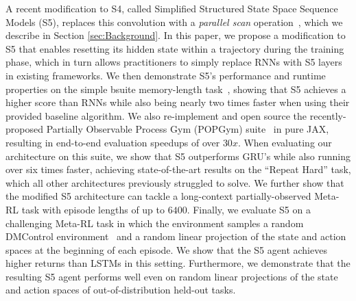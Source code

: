 \documentclass{article}
\begin{document}
A recent modification to S4, called Simplified Structured State Space Sequence Models (S5), replaces this convolution with a \textit{parallel scan} operation~\citep{smith2022simplified}, which we describe in Section \ref{sec:Background}. In this paper, we propose a modification to S5 that enables resetting its hidden state within a trajectory during the training phase, which in turn allows practitioners to simply replace RNNs with S5 layers in existing frameworks. We then demonstrate S5's performance and runtime properties on the simple bsuite memory-length task~\citep{osband2019behaviour}, showing that S5 achieves a higher score than RNNs while also being nearly two times faster when using their provided baseline algorithm. 
We also re-implement and open source the recently-proposed Partially Observable Process Gym (POPGym) suite~\citep{morad2023popgym} in pure JAX, resulting in end-to-end evaluation speedups of over $30x$. When evaluating our architecture on this suite, we show that S5 outperforms GRU's while also running over six times faster, achieving state-of-the-art results on the ``Repeat Hard'' task, which all other architectures previously struggled to solve.
We further show that the modified S5 architecture can tackle a long-context partially-observed Meta-RL task with episode lengths of up to $6400$. Finally, we evaluate S5 on a challenging Meta-RL task in which the environment samples a random DMControl environment~\citep{tassa2018deepmind} and a random linear projection of the state and action spaces at the beginning of each episode. We show that the S5 agent achieves higher returns than LSTMs in this setting. Furthermore, we demonstrate that the resulting S5 agent performs well even on random linear projections of the state and action spaces of out-of-distribution held-out tasks.
\end{document}

